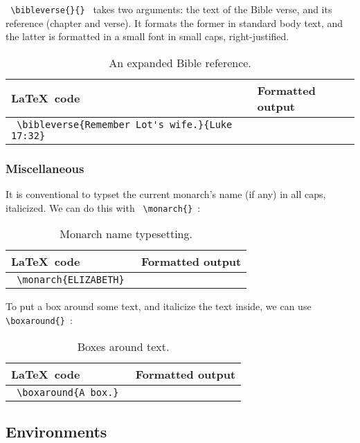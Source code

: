 \documentclass{article}
\begin{document}
\lstinline! \bibleverse{}{} ! takes two arguments: the text of the Bible verse, and its reference (chapter and verse). It formats the former in standard body text, and the latter is formatted in a small font in small caps, right-justified.

\begin{table}[h!]
	\centering
	\begin{tabular}{l l} 
	\toprule
	\LaTeX\ code & Formatted output \\
	\midrule
	\lstinline! \bibleverse{Remember Lot's wife.}{Luke 17:32} ! & \sabon{Remember Lot's wife. \scriptsize\textsc{Luke 17:32} } \\
	\bottomrule
	\end{tabular}
	\caption{An expanded Bible reference.}
\end{table}

\subsubsection{Miscellaneous}

It is conventional to typset the current monarch’s name (if any) in all caps, italicized. We can do this with \lstinline! \monarch{} !:

\begin{table}[h!]
	\centering
	\begin{tabular}{l l} 
	\toprule
	\LaTeX\ code & Formatted output \\
	\midrule
	\lstinline! \monarch{ELIZABETH} ! & \sabon{\monarch{ELIZABETH}} \\
	\bottomrule
	\end{tabular}
	\caption{Monarch name typesetting.}
\end{table}

To put a box around some text, and italicize the text inside, we can use \lstinline! \boxaround{} !:

\begin{table}[h!]
	\centering
	\begin{tabular}{l l} 
	\toprule
	\LaTeX\ code & Formatted output \\
	\midrule
	\lstinline! \boxaround{A box.} ! & \sabon{\fbox{A box.}} \\
	\bottomrule
	\end{tabular}
	\caption{Boxes around text.}
\end{table}

\blankline
\subsection{Environments}
\end{document}
